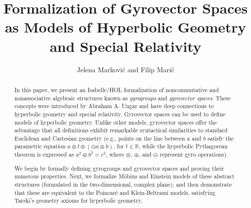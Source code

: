 \documentclass[11pt,a4paper]{article}
\begin{document}
\title{Formalization of Gyrovector Spaces as Models of Hyperbolic Geometry and Special Relativity}
\author{Jelena Markovi\' c and Filip Mari\' c}
\maketitle

\begin{abstract}
  In this paper, we present an Isabelle/HOL formalization of
  noncommu\-ta\-ti\-ve and nonassociative algebraic structures known
  as \emph{gyrogroups} and \emph{gyrovector spaces}. These concepts
  were introduced by Abraham A. Ungar \cite{ungar-analytic} and have deep connections to
  hyperbolic geometry and special relativity. Gyrovector spaces can be
  used to define models of hyperbolic geometry. Unlike other models,
  gyrovector spaces offer the advantage that all definitions exhibit
  remarkable syntactical similarities to standard Euclidean and
  Cartesian geometry (e.g., points on the line between $a$ and $b$
  satisfy the parametric equation
  $ a \oplus t \otimes(\ominus a \oplus b)$, for $t \in \mathbb{R}$,
  while the hyperbolic Pythagorean theorem is expressed as
  $a^2\oplus b^2 = c^2$, where $\otimes$, $\oplus$, and $\ominus$
  represent gyro operations).

  We begin by formally defining gyrogroups and gyrovector spaces and
  proving their numerous properties. Next, we formalize M\"obius and
  Einstein models of these abstract structures (formulated in the
  two-dimensional, complex plane), and then demonstrate that these are
  equivalent to the Poincar\'e and Klein-Beltrami models, satisfying
  Tarski's geometry axioms for hyperbolic geometry.
\end{abstract}

\tableofcontents





\end{document}
